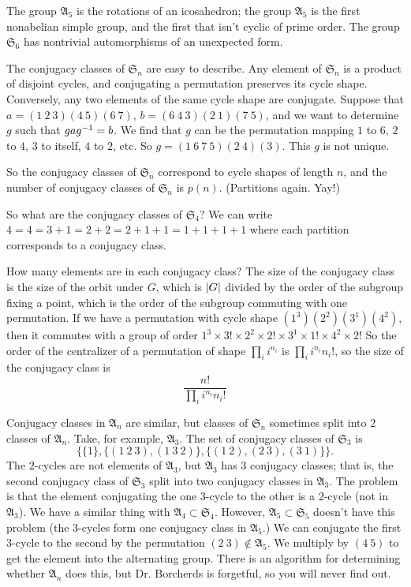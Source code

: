 \documentclass[11pt, twoside]{amsart}
\begin{document}
The group $\mathfrak{A}_5$ is the rotations of an icosahedron; the group $\mathfrak{A}_5$ is the first nonabelian simple group, and the first that isn't cyclic of prime order. The group $\mathfrak{S}_6$ has nontrivial automorphisms of an unexpected form.

The conjugacy classes of $\mathfrak{S}_n$ are easy to describe. Any element of $\mathfrak{S}_n$ is a product of disjoint cycles, and conjugating a permutation preserves its cycle shape. Conversely, any two elements of the same cycle shape are conjugate. Suppose that
$a = (1\ 2\ 3)(4\ 5)(6\ 7)$, $b = (6\ 4\ 3)(2\ 1)(7\ 5)$, and we want to determine $g$ such that $gag^{-1} =b$. We find that $g$ can be the permutation mapping $1$ to $6$, $2$ to $4$, $3$ to itself, $4$ to $2$, etc. So $g = (1\ 6\ 7\ 5)(2\ 4)(3)$. This $g$ is not unique.

So the conjugacy classes of $\mathfrak{S}_n$ correspond to cycle shapes of length $n$, and the number of conjugacy classes of $\mathfrak{S}_n$ is $p(n)$. (Partitions again. Yay!)

So what are the conjugacy classes of $\mathfrak{S}_4$? We can write $4 = 4 = 3+1 = 2+2 = 2+1 + 1 = 1+1+1+1$ where each partition corresponds to a conjugacy class. 

How many elements are in each conjugacy class? The size of the conjugacy class is the size of the orbit under $G$, which is $\left \lvert G \right \rvert$ divided by the order of the subgroup fixing a point, which is the order of the subgroup commuting with one permutation. If we have a permutation with cycle shape $(1^3)( 2^2 )(3^1)(4^2)$, then it commutes with a group of order $1^3 \times 3! \times 2^2 \times 2!\times 3^1 \times 1! \times 4^2 \times 2!$ So the order of the centralizer of a permutation of shape $\prod_ i i^{n_i}$ is $\prod_i i^{n_i} n_i!$, so the size of the conjugacy class is
$$
\frac{n!}{\prod_i i^{n_i} n_i!}
$$

Conjugacy classes in $\mathfrak{A}_n$ are similar, but classes of $\mathfrak{S}_n$ sometimes split into $2$ classes of $\mathfrak{A}_n$. Take, for example, $\mathfrak{A}_3$. The set of conjugacy classes of $\mathfrak{S}_3$ is 
$$
\{\{1\}, \{(1\ 2\ 3), (1\ 3\ 2)\}, \{(1\ 2),(2\ 3),(3\ 1)\}\}.
$$
The $2$-cycles are not elements of $\mathfrak{A}_3$, but $\mathfrak{A}_3$ has $3$ conjugacy classes; that is, the second conjugacy class of $\mathfrak{S}_3$ split into two conjugacy classes in $\mathfrak{A}_3$. The problem is that the element conjugating the one $3$-cycle to the other is a $2$-cycle (not in $\mathfrak{A}_3$). We have a similar thing with $\mathfrak{A}_4 \subset \mathfrak{S}_4$. However, $\mathfrak{A}_5\subset \mathfrak{S}_5$ doesn't have this problem (the $3$-cycles form one conjugacy class in $\mathfrak{A}_5$.) We can conjugate the first $3$-cycle to the second by the permutation $(2\ 3)\notin \mathfrak{A}_5$. We multiply by $(4\ 5)$ to get the element into the alternating group. There is an algorithm for determining whether $\mathfrak{A}_n$ does this, but Dr. Borcherds is forgetful, so you will never find out.
\end{document}
